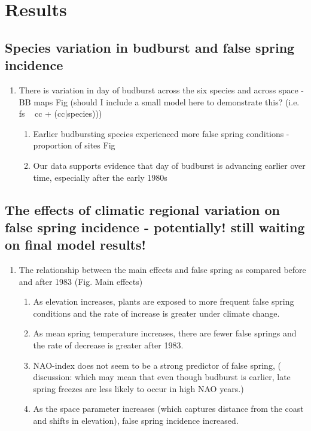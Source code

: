 \documentclass{article}\usepackage[]{graphicx}\usepackage[]{color}
\begin{document}
\section*{Results}
\subsection*{Species variation in budburst and false spring incidence}
\begin{enumerate}
\item There is variation in day of budburst across the six species and across space - BB maps Fig (should I include a small model here to demonstrate this? (i.e. fs ~ cc + (cc|species)))
\begin{enumerate}
\item Earlier budbursting species experienced more false spring conditions - proportion of sites Fig
\item Our data supports evidence that day of budburst is advancing earlier over time, especially after the early 1980s
\end{enumerate}
\end{enumerate}

\subsection*{The effects of climatic regional variation on false spring incidence - potentially! still waiting on final model results!}
\begin{enumerate}
\item The relationship between the main effects and false spring as compared before and after 1983 (Fig. Main effects)
\begin{enumerate}
\item As elevation increases, plants are exposed to more frequent false spring conditions and the rate of increase is greater under climate change.
\item As mean spring temperature increases, there are fewer false springs and the rate of decrease is greater after 1983.
\item NAO-index does not seem to be a strong predictor of false spring, ( discussion: which may mean that even though budburst is earlier, late spring freezes are less likely to occur in high NAO years.)
\item As the space parameter increases (which captures distance from the coast and shifts in elevation), false spring incidence increased. 
\end{enumerate}
\end{enumerate}
\end{document}
